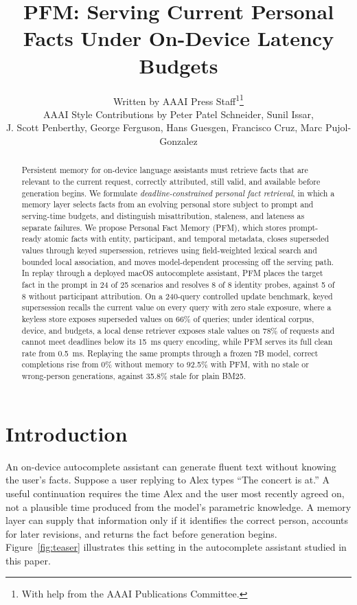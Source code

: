 \documentclass[letterpaper]{article} %
\title{PFM: Serving Current Personal Facts Under On-Device Latency Budgets}
\author{
    Written by AAAI Press Staff\textsuperscript{\rm 1}\thanks{With help from the AAAI Publications Committee.}\\
    AAAI Style Contributions by Peter Patel Schneider,
    Sunil Issar,\\
    J. Scott Penberthy,
    George Ferguson,
    Hans Guesgen,
    Francisco Cruz\equalcontrib\corresponding,
    Marc Pujol-Gonzalez\equalcontrib\corresponding
}
\begin{document}
\maketitle

\begin{abstract}
Persistent memory for on-device language assistants must retrieve facts that are relevant to the current request, correctly attributed, still valid, and available before generation begins. We formulate \emph{deadline-constrained personal fact retrieval}, in which a memory layer selects facts from an evolving personal store subject to prompt and serving-time budgets, and distinguish misattribution, staleness, and lateness as separate failures. We propose Personal Fact Memory (PFM), which stores prompt-ready atomic facts with entity, participant, and temporal metadata, closes superseded values through keyed supersession, retrieves using field-weighted lexical search and bounded local association, and moves model-dependent processing off the serving path. In replay through a deployed macOS autocomplete assistant, PFM places the target fact in the prompt in 24 of 25 scenarios and resolves 8 of 8 identity probes, against 5 of 8 without participant attribution. On a 240-query controlled update benchmark, keyed supersession recalls the current value on every query with zero stale exposure, where a keyless store exposes superseded values on 66\% of queries; under identical corpus, device, and budgets, a local dense retriever exposes stale values on 78\% of requests and cannot meet deadlines below its 15~ms query encoding, while PFM serves its full clean rate from 0.5~ms. Replaying the same prompts through a frozen 7B model, correct completions rise from 0\% without memory to 92.5\% with PFM, with no stale or wrong-person generations, against 35.8\% stale for plain BM25.
\end{abstract}

\section{Introduction}

An on-device autocomplete assistant can generate fluent text without knowing the user's facts. Suppose a user replying to Alex types ``The concert is at.'' A useful continuation requires the time Alex and the user most recently agreed on, not a plausible time produced from the model's parametric knowledge. A memory layer can supply that information only if it identifies the correct person, accounts for later revisions, and returns the fact before generation begins. Figure~\ref{fig:teaser} illustrates this setting in the autocomplete assistant studied in this paper.
\end{document}
